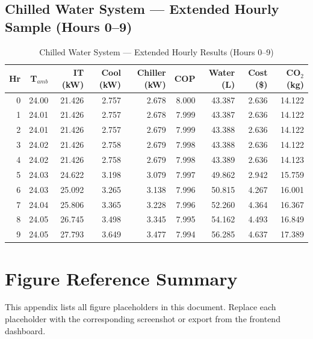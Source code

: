 \documentclass[12pt,a4paper]{report}
\begin{document}
\section{Chilled Water System --- Extended Hourly Sample (Hours 0--9)}

\begin{table}[H]
\centering
\caption{Chilled Water System --- Extended Hourly Results (Hours 0--9)}
\label{tab:chw_10hr}
\renewcommand{\arraystretch}{1.2}
\scriptsize
\begin{tabular}{rrrrrrrrr}
\toprule
\textbf{Hr} & \textbf{T$_{amb}$} & \textbf{IT (kW)} & \textbf{Cool (kW)} & \textbf{Chiller (kW)} & \textbf{COP} & \textbf{Water (L)} & \textbf{Cost (\$)} & \textbf{CO$_2$ (kg)} \\
\midrule
0 & 24.00 & 21.426 & 2.757 & 2.678 & 8.000 & 43.387 & 2.636 & 14.122 \\
1 & 24.01 & 21.426 & 2.757 & 2.678 & 7.999 & 43.387 & 2.636 & 14.122 \\
2 & 24.01 & 21.426 & 2.757 & 2.679 & 7.999 & 43.388 & 2.636 & 14.122 \\
3 & 24.02 & 21.426 & 2.758 & 2.679 & 7.998 & 43.388 & 2.636 & 14.122 \\
4 & 24.02 & 21.426 & 2.758 & 2.679 & 7.998 & 43.389 & 2.636 & 14.123 \\
5 & 24.03 & 24.622 & 3.198 & 3.079 & 7.997 & 49.862 & 2.942 & 15.759 \\
6 & 24.03 & 25.092 & 3.265 & 3.138 & 7.996 & 50.815 & 4.267 & 16.001 \\
7 & 24.04 & 25.806 & 3.365 & 3.228 & 7.996 & 52.260 & 4.364 & 16.367 \\
8 & 24.05 & 26.745 & 3.498 & 3.345 & 7.995 & 54.162 & 4.493 & 16.849 \\
9 & 24.05 & 27.793 & 3.649 & 3.477 & 7.994 & 56.285 & 4.637 & 17.389 \\
\bottomrule
\end{tabular}
\end{table}

\newpage

\chapter{Figure Reference Summary}
\label{app:figures}

This appendix lists all figure placeholders in this document. Replace each placeholder with
the corresponding screenshot or export from the frontend dashboard.
\end{document}

